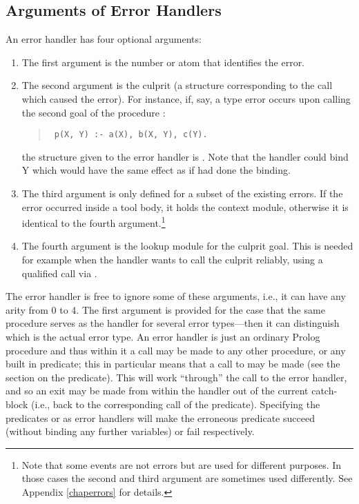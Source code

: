 \subsection{Arguments of Error Handlers}
An error handler has four optional arguments:
\begin{enumerate}
\item The first argument is the number or atom that identifies the error.
\item The second argument is
the culprit (a structure corresponding to the call which caused the
error).
For instance, if,
say, a type error occurs upon calling the second goal of the procedure
:
\begin{quote}
\begin{verbatim}
 p(X, Y) :- a(X), b(X, Y), c(Y).
\end{verbatim}
\end{quote}
the structure given to the error handler is .
Note that the handler could bind Y which would have the same effect
as if  had done the binding.

\item The third argument is only defined for a subset of the existing errors.
If the error occurred inside a tool body, it holds the context module,
otherwise it is identical to the fourth argument.\footnote{%
  Note that some events are not errors but are used for different purposes.
  In those cases the second and third argument are sometimes used
  differently. See Appendix \ref{chaperrors} for details.}

\item The fourth argument is the lookup module for the culprit goal.  This
is needed for example when the handler wants to call the culprit reliably,
using a qualified call via .
\end{enumerate}

The error handler is free to ignore some of these arguments,
i.e., it can have any arity from 0 to 4.
The first argument is provided for the case that the same procedure serves
as the handler for several error types---then it can distinguish
which is the actual error type.
An error handler is just an ordinary Prolog procedure and thus within
it a call may be made to any other procedure, or any built in predicate;
this in particular means that a call to
 may be
made (see the section on the
predicate). This will work
``through'' the call to the error handler, and so an exit may be made from
within the handler out of the current catch-block (i.e., back to the corresponding
call of the  predicate).
Specifying the predicates  or
 as error handlers
will make the erroneous predicate succeed (without binding
any further variables) or fail respectively.

